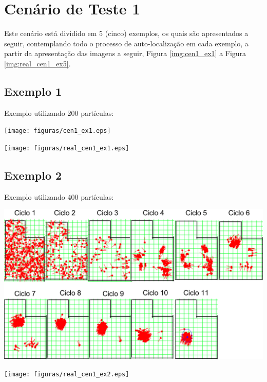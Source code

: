 \section{Cenário de Teste 1}

Este cenário está dividido em 5 (cinco) exemplos, os quais são apresentados a seguir, contemplando todo o processo de auto-localização
em cada exemplo, a partir da apresentação das imagens a seguir, Figura \ref{img:cen1_ex1} a Figura \ref{img:real_cen1_ex5}.

\subsection{Exemplo 1}

Exemplo utilizando 200 partículas:

{\centering
\texttt{[image: figuras/cen1\_ex1.eps]}
\label{img:cen1_ex1}
\par}

{\centering
\texttt{[image: figuras/real\_cen1\_ex1.eps]}
\label{img:real_cen1_ex1}
\par}

\subsection{Exemplo 2}

Exemplo utilizando 400 partículas:

{\centering
\includegraphics[scale=0.4]{figuras/cen1_ex2.eps}
\label{img:cen1_ex2}
\par}

{\centering
\texttt{[image: figuras/real\_cen1\_ex2.eps]}
\label{img:real_cen1_ex2}
\par}

